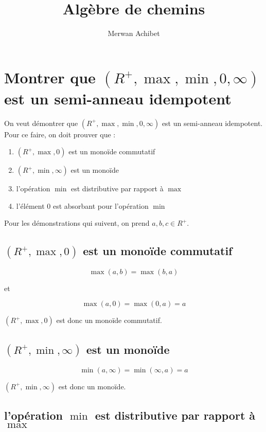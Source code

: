 \documentclass{article}
\title{Algèbre de chemins}
\author{Merwan Achibet}
\date{}
\begin{document}
\newcommand{\mmin}{\ensuremath{\operatorname{min}}}
\newcommand{\mmax}{\ensuremath{\operatorname{max}}}
\newcommand{\mMIN}{\ensuremath{\operatorname{MAX}}}
\newcommand{\mMAX}{\ensuremath{\operatorname{MAX}}}

\maketitle

\section{Montrer que $(R^+, \mmax, \mmin, 0,
  \infty)$ est un semi-anneau idempotent}

On veut démontrer que $(R^+, \mmax, \mmin, 0, \infty)$ est un
semi-anneau idempotent. Pour ce faire, on doit prouver que :

\begin{enumerate}
  \item{$(R^+, \mmax, 0)$ est un monoïde commutatif}
  \item{$(R^+, \mmin, \infty)$ est un monoïde}
  \item{l'opération $\mmin$ est distributive par rapport à $\mmax$}
  \item{l'élément $0$ est absorbant pour l'opération $\mmin$}
\end{enumerate}

Pour les démonstrations qui suivent, on prend $a, b, c \in R^+$.

\subsection{$(R^+, \mmax, 0)$ est un monoïde commutatif}

$$ \mmax(a, b) = \mmax(b, a)$$
\begin{center}et\end{center}
$$ \mmax(a, 0) = \mmax(0, a) = a $$

$(R^+, \mmax, 0)$ est donc un monoïde commutatif.

\subsection{$(R^+, \mmin, \infty)$ est un monoïde}

$$ \mmin(a, \infty) = \mmin(\infty, a) = a$$

$(R^+, \mmin, \infty)$ est donc un monoïde.

\subsection{l'opération $\mmin$ est distributive par rapport à $\mmax$}
\end{document}

